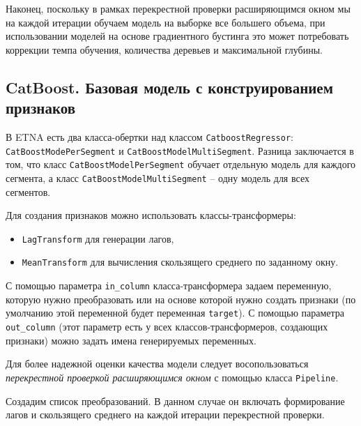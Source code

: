 \documentclass[%
	11pt,
	a4paper,
	utf8,
		]{article}
\begin{document}
Наконец, поскольку в рамках перекрестной проверки расширяющимся окном мы на каждой итерации обучаем модель на выборке все большего объема, при использовании моделей на основе градиентного бустинга это может потребовать коррекции темпа обучения, количества деревьев и максимальной глубины. 

\subsection{CatBoost. Базовая модель с конструированием признаков}

В ETNA есть два класса-обертки над классом \texttt{CatboostRegressor}: \texttt{CatBoostModePerSegment} и \texttt{CatBoostModelMultiSegment}. Разница заключается в том, что класс \texttt{CatBoostModelPerSegment} обучает отдельную модель для каждого сегмента, а класс \texttt{CatBoostModelMultiSegment} -- одну модель для всех сегментов.

Для создания признаков можно использовать классы-трансформеры:
\begin{itemize}
	\item \texttt{LagTransform} для генерации лагов,
	
	\item \texttt{MeanTransform} для вычисления скользящего среднего по заданному окну.
\end{itemize}


С помощью параметра \verb|in_column| класса-трансформера задаем переменную, которую нужно преобразовать или на основе которой нужно создать признаки (по умолчанию этой переменной будет переменная \texttt{target}). С помощью параметра \verb|out_column| (этот параметр есть у всех классов-трансформеров, создающих признаки) можно задать имена генерируемых переменных.

Для более надежной оценки качества модели следует восопользоваться \emph{перекрестной проверкой расширяющимся окном} с помощью класса \texttt{Pipeline}.

Создадим список преобразований. В данном случае он включать формирование лагов и скользящего среднего на каждой итерации перекрестной проверки.
\end{document}
